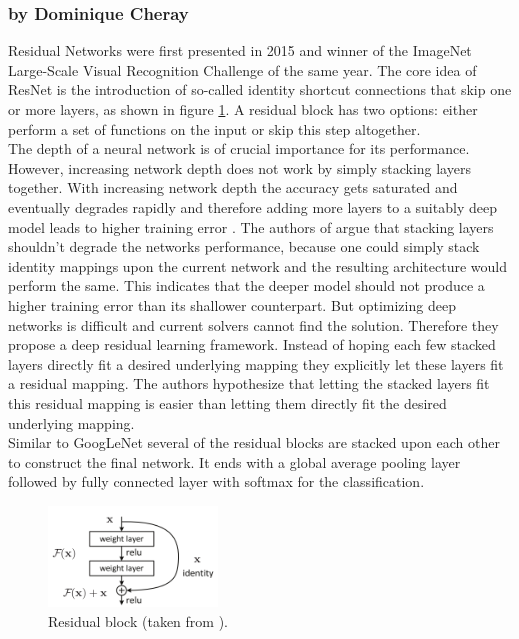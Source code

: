 \documentclass[11pt]{report}
\begin{document}
\subsubsection{by Dominique Cheray}
Residual Networks were first presented in 2015 and winner of the ImageNet
Large-Scale Visual Recognition Challenge of the same year. The core idea of
ResNet is the introduction of so-called identity shortcut connections that skip
one or more layers, as shown in figure \ref{ResidualBlock}. A residual block has
two options: either perform a set of functions on the input or skip this step
altogether. \\
The depth of a neural network is of crucial importance for its performance.
However, increasing network depth does not work by simply
stacking layers together. With increasing network depth the accuracy gets saturated
and eventually degrades rapidly and therefore adding more layers to a suitably
deep model leads to higher training error \cite{he2016deep}.
The authors of \cite{he2016deep} argue that stacking layers shouldn't degrade the networks
performance, because one could simply stack identity mappings upon the current
network and the resulting architecture would perform the same. This indicates
that the deeper model should not produce a higher training error than its
shallower counterpart. But optimizing deep networks is difficult and current
solvers cannot find the solution. Therefore they propose a deep residual
learning framework. Instead of hoping each few stacked layers directly fit a
desired underlying mapping they explicitly let these layers fit a residual
mapping. The authors hypothesize that letting the stacked layers fit this
residual mapping is easier than letting them directly fit the desired underlying
mapping. \\
Similar to GoogLeNet several of the residual blocks are stacked upon each other
to construct the final network. It ends with a global average pooling layer
followed by fully connected layer with softmax for the classification. 
\begin{figure}
  \centering
  \includegraphics[width=0.4\textwidth]{ResidualBlock}
  \caption{Residual block (taken from \cite{he2016deep}).}
  \label{ResidualBlock}
\end{figure}
\end{document}
